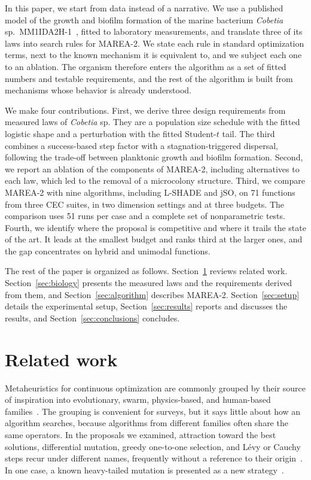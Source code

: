 \documentclass[preprint,12pt]{elsarticle}
\begin{document}
In this paper, we start from data instead of a narrative. We use a published
model of the growth and biofilm formation of the marine bacterium
\emph{Cobetia} sp.\ MM1IDA2H-1~\cite{stehlik2025cobetia}, fitted to laboratory
measurements, and translate three of its laws into search rules for MAREA-2.
We state each rule in standard optimization terms, next to the known mechanism
it is equivalent to, and we subject each one to an ablation. The organism
therefore enters the algorithm as a set of fitted numbers and testable
requirements, and the rest of the algorithm is built from mechanisms whose
behavior is already understood.

We make four contributions. First, we derive three design requirements from
measured laws of \emph{Cobetia} sp. They are a population size schedule with the fitted logistic shape and a
perturbation with the fitted Student-$t$ tail. The third combines a
success-based step factor with a stagnation-triggered dispersal, following the
trade-off between planktonic growth and biofilm formation. Second, we report an ablation of the components of MAREA-2, including
alternatives to each law, which led to the removal of a microcolony structure.
Third, we compare MAREA-2 with nine algorithms, including L-SHADE and jSO, on 71
functions from three CEC suites, in two dimension settings and at three
budgets. The comparison uses 51 runs per case and a complete set of
nonparametric tests.
Fourth, we identify where the proposal is competitive and where it trails the
state of the art. It leads at the smallest budget and ranks third at the larger
ones, and the gap concentrates on hybrid and unimodal functions.

The rest of the paper is organized as follows. Section~\ref{sec:related}
reviews related work. Section~\ref{sec:biology} presents the measured laws and
the requirements derived from them, and Section~\ref{sec:algorithm} describes
MAREA-2. Section~\ref{sec:setup} details the experimental setup,
Section~\ref{sec:results} reports and discusses the results, and
Section~\ref{sec:conclusions} concludes.

\section{Related work}
\label{sec:related}

Metaheuristics for continuous optimization are commonly grouped by their source
of inspiration into evolutionary, swarm, physics-based, and human-based
families~\cite{mirjalili2014gwo,abdelbasset2023koa,fu2024sboa}. The grouping is
convenient for surveys, but it says little about how an algorithm searches,
because algorithms from different families often share the same operators. In
the proposals we examined, attraction toward the best solutions, differential
mutation, greedy one-to-one selection, and Lévy or Cauchy steps recur under
different names, frequently without a reference to their
origin~\cite{dehghani2023coa,chopra2022gjo,ferahtia2023rth}. In one case, a
known heavy-tailed mutation is presented as a new strategy~\cite{wang2024bka}.
\end{document}
